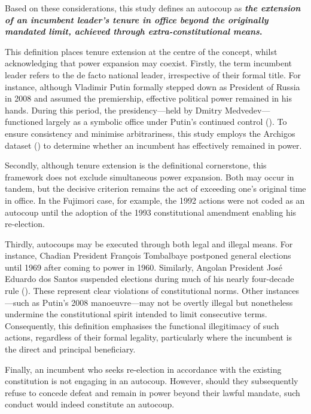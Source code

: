 \documentclass[
  12pt,
]{report}
\begin{document}
Based on these considerations, this study defines an autocoup as
\textbf{\emph{the extension of an incumbent leader's tenure in office
beyond the originally mandated limit, achieved through
extra-constitutional means}.}

This definition places tenure extension at the centre of the concept,
whilst acknowledging that power expansion may coexist. Firstly, the term
incumbent leader refers to the de facto national leader, irrespective of
their formal title. For instance, although Vladimir Putin formally
stepped down as President of Russia in 2008 and assumed the premiership,
effective political power remained in his hands. During this period, the
presidency---held by Dmitry Medvedev---functioned largely as a symbolic
office under Putin's continued control
(). To ensure consistency and
minimise arbitrariness, this study employs the Archigos dataset
() to
determine whether an incumbent has effectively remained in power.

Secondly, although tenure extension is the definitional cornerstone,
this framework does not exclude simultaneous power expansion. Both may
occur in tandem, but the decisive criterion remains the act of exceeding
one's original time in office. In the Fujimori case, for example, the
1992 actions were not coded as an autocoup until the adoption of the
1993 constitutional amendment enabling his re-election.

Thirdly, autocoups may be executed through both legal and illegal means.
For instance, Chadian President François Tombalbaye postponed general
elections until 1969 after coming to power in 1960. Similarly, Angolan
President José Eduardo dos Santos suspended elections during much of his
nearly four-decade rule (). These represent clear violations of constitutional norms.
Other instances---such as Putin's 2008 manoeuvre---may not be overtly
illegal but nonetheless undermine the constitutional spirit intended to
limit consecutive terms. Consequently, this definition emphasises the
functional illegitimacy of such actions, regardless of their formal
legality, particularly where the incumbent is the direct and principal
beneficiary.

Finally, an incumbent who seeks re-election in accordance with the
existing constitution is not engaging in an autocoup. However, should
they subsequently refuse to concede defeat and remain in power beyond
their lawful mandate, such conduct would indeed constitute an autocoup.
\end{document}
